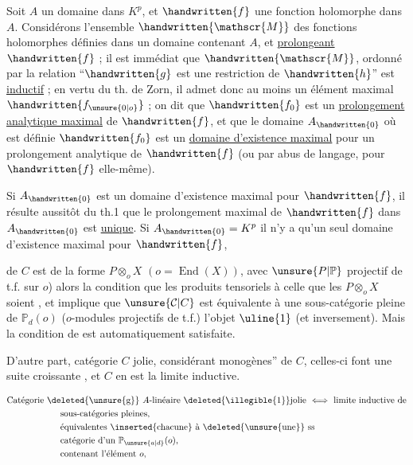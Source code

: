 Soit $A$ un domaine dans $K^p$, et $\handwritten{f}$ une fonction holomorphe dans $A$. Considérons l'ensemble $\handwritten{\mathscr{M}}$ des fonctions holomorphes définies dans un domaine contenant $A$, et \uline{prolongeant} $\handwritten{f}$ ; il est immédiat que $\handwritten{\mathscr{M}}$, ordonné par la relation ``$\handwritten{g}$ est une restriction de $\handwritten{h}$'' est \uline{inductif} ; en vertu du th. de Zorn, il admet donc au moins un élément maximal $\handwritten{f_{\unsure{0|o}}}$ ;  on dit que $\handwritten{f_{0}}$ est un \uline{prolongement analytique maximal} de $\handwritten{f}$, et que le domaine $A_{\handwritten{0}}$ où est définie $\handwritten{f_{0}}$ est un \uline{domaine d'existence maximal} pour un prolongement analytique de $\handwritten{f}$ (ou par abus de langage, pour $\handwritten{f}$ elle-même).

Si $A_{\handwritten{0}}$ est un domaine d'existence maximal pour $\handwritten{f}$, il résulte aussitôt du th.1 que le prolongement maximal de $\handwritten{f}$ dans $A_{\handwritten{0}}$ est \uline{unique}. Si $A_{\handwritten{0}}=K^p$ il n'y a qu'un seul domaine d'existence maximal pour $\handwritten{f}$,

de $C$ est de la forme $P\otimes_o X$ $(o=\operatorname{End}(X))$, avec $\unsure{P|\mathbb{P}}$ projectif de t.f. sur $o$) alors la condition que les produits tensoriels    à celle que  les $P\otimes_o X$ soient , et implique que $\unsure{\mathcal{C}|C}$ est équivalente à une sous-catégorie pleine de $\mathbb{P}_d(o)$ ($o$-modules  projectifs de t.f.)   l'objet $\uline{1}$ (et inversement). Mais la condition de  est automatiquement satisfaite.

D'autre part,  catégorie  $C$ jolie, considérant  monogènes'' de $C$, celles-ci font une suite croissante , et $C$ en est la limite inductive.

\[
\begin{aligned}
&\text{Catégorie }\deleted{\text{\unsure{g}}}\ A\text{-linéaire }\deleted{\text{\illegible{1}}}\text{jolie}\ \Longleftrightarrow\ \text{limite inductive de}\\
&\qquad\qquad\qquad\text{sous-catégories pleines,}\\
&\qquad\qquad\qquad\text{équivalentes}\ \inserted{\text{chacune}}\ \text{à}\ \deleted{\text{\unsure{une}}}\ \text{ss}\\
&\qquad\qquad\qquad\text{catégorie d'un }\mathbb{P}_{\unsure{a|d}}(o),\\
&\qquad\qquad\qquad\text{contenant l'élément }o,
\end{aligned}
\]
\margin{(}

